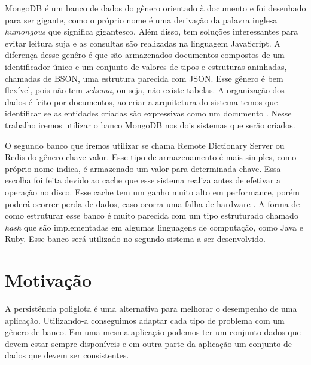 MongoDB é um banco de dados do gênero orientado à documento e foi desenhado para ser gigante, como o próprio nome é uma derivação da palavra inglesa \textit{humongous} que significa gigantesco. Além disso, tem soluções interessantes para evitar leitura suja e as consultas são realizadas na linguagem JavaScript. A diferença desse genêro é que são armazenados documentos compostos de um identificador único e um conjunto de valores de tipos e estruturas aninhadas, chamadas de BSON, uma estrutura parecida com JSON. Esse gênero é bem flexível, pois não tem \textit{schema}, ou seja, não existe tabelas. A organização dos dados é feito por documentos, ao criar a arquitetura do sistema temos que identificar se as entidades criadas são expressivas como um documento \cite{SDSW}. Nesse trabalho iremos utilizar o banco MongoDB nos dois sistemas que serão criados.

O segundo banco que iremos utilizar se chama Remote Dictionary Server ou Redis do gênero chave-valor. Esse tipo de armazenamento é mais simples, como próprio nome indica, é armazenado um valor para determinada chave. Essa escolha foi feita devido ao cache que esse sistema realiza antes de efetivar a operação no disco. Esse cache tem um ganho muito alto em performance, porém poderá ocorrer perda de dados, caso ocorra uma falha de hardware \cite{SDSW}. A forma de como estruturar esse banco é muito parecida com um tipo estruturado chamado \textit{hash} que são implementadas em algumas linguagens de computação, como Java e Ruby. Esse banco será utilizado no segundo sistema a ser desenvolvido.

\section{Motivação}
\label{sec:motivacao}
A persistência poliglota é uma alternativa para melhorar o desempenho de uma aplicação. Utilizando-a conseguimos adaptar cada tipo de problema com um gênero de banco.  Em uma mesma aplicação podemos ter um conjunto dados que devem estar sempre disponíveis e em outra parte da aplicação um conjunto de dados que devem ser consistentes.
